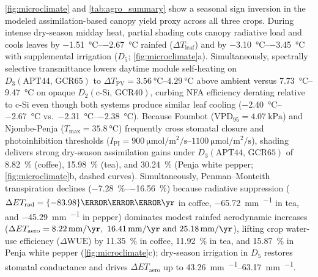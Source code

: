 \documentclass[preprint,12pt,a4paper]{elsarticle}
\begin{document}
\cref{fig:microclimate} and \cref{tab:agro_summary} show a seasonal sign inversion in the modeled assimilation-based canopy yield proxy across all three crops. During intense dry-season midday heat, partial shading cuts canopy radiative load and cools leaves by \qtyrange{-1.51}{-2.67}{\celsius} rainfed ($\Delta T_{\mathrm{leaf}}$) and by \qtyrange{-3.10}{-3.45}{\celsius} with supplemental irrigation ($D_5$; \cref{fig:microclimate}a). Simultaneously, spectrally selective transmittance lowers daytime module self-heating on $D_3(\mathrm{APT44,\,GCR65})$ to $\Delta T_{\mathrm{PV}} = \qtyrange{3.56}{4.29}{\celsius}$ above ambient versus \qtyrange{7.73}{9.47}{\celsius} on opaque $D_2(\mathrm{c\text{-}Si,\,GCR40})$, curbing NFA efficiency derating relative to c-Si even though both systems produce similar leaf cooling (\qtyrange{-2.40}{-2.67}{\celsius} vs.\ \qtyrange{-2.31}{-2.38}{\celsius}). Because Foumbot ($\mathrm{VPD}_{95} = \qty{4.07}{\kilo\pascal}$) and Njombe-Penja ($T_{\max} = \qty{35.8}{\celsius}$) frequently cross stomatal closure and photoinhibition thresholds ($I_{\mathrm{PI}}=\qtyrange{900}{1100}{\micro\mole\per\square\meter\per\second}$), shading delivers strong dry-season assimilation gains under $D_3(\mathrm{APT44,\,GCR65})$ of \qty{+8.82}{\percent} (coffee), \qty{+15.98}{\percent} (tea), and \qty{+30.24}{\percent} (Penja white pepper; \cref{fig:microclimate}b, dashed curves). Simultaneously, Penman--Monteith transpiration declines (\qtyrange{-7.28}{-16.56}{\percent}) because radiative suppression ($\Delta ET_{\mathrm{rad}} = \qty{-83.98}{\milli\meter\per\yr}$ in coffee, \qty{-65.72}{\milli\meter\per\yr} in tea, and \qty{-45.29}{\milli\meter\per\yr} in pepper) dominates modest rainfed aerodynamic increases ($\Delta ET_{\mathrm{aero}} = \qtylist{+8.22;+16.41;+25.18}{\milli\meter\per\yr}$), lifting crop water-use efficiency ($\Delta\mathrm{WUE}$) by \qty{+11.35}{\percent} in coffee, \qty{+11.92}{\percent} in tea, and \qty{+15.87}{\percent} in Penja white pepper (\cref{fig:microclimate}c); dry-season irrigation in $D_5$ restores stomatal conductance and drives $\Delta ET_{\mathrm{aero}}$ up to \qtyrange{+43.26}{+63.17}{\milli\meter\per\yr}.
\end{document}
